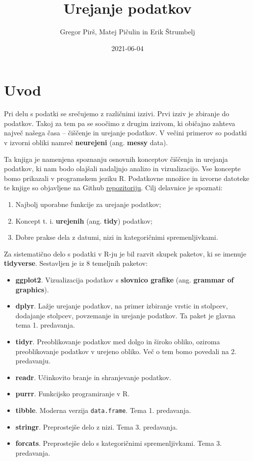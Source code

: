 \documentclass[
]{book}
\title{Urejanje podatkov}
\author{Gregor Pirš, Matej Pičulin in Erik Štrumbelj}
\date{2021-06-04}
\providecommand{\tightlist}{%
  \setlength{\itemsep}{0pt}\setlength{\parskip}{0pt}}
\begin{document}
\maketitle

{
\setcounter{tocdepth}{1}
\tableofcontents
}
\hypertarget{uvod}{%
\chapter*{Uvod}\label{uvod}}

Pri delu s podatki se srečujemo z različnimi izzivi. Prvi izziv je zbiranje do podatkov. Takoj za tem pa se soočimo z drugim izzivom, ki običajno zahteva največ našega časa -- čiščenje in urejanje podatkov. V večini primerov so podatki v izvorni obliki namreč \textbf{neurejeni} (ang. \textbf{messy} data).

Ta knjiga je namenjena spoznanju osnovnih konceptov čiščenja in urejanja podatkov, ki nam bodo olajšali nadaljnjo analizo in vizualizacijo. Vse koncepte bomo prikazali v programskem jeziku R. Podatkovne množice in izvorne datoteke te knjige so objavljene na Github \href{https://github.com/bstatcomp/urejanje-podatkov}{repozitoriju}. Cilj delavnice je spoznati:

\begin{enumerate}
\def\labelenumi{\arabic{enumi})}
\tightlist
\item
  Najbolj uporabne funkcije za urejanje podatkov;
\item
  Koncept t. i. \textbf{urejenih} (ang. \textbf{tidy}) podatkov;
\item
  Dobre prakse dela z datumi, nizi in kategoričnimi spremenljivkami.
\end{enumerate}

Za sistematično delo s podatki v R-ju je bil razvit skupek paketov, ki se imenuje \textbf{tidyverse}. Sestavljen je iz 8 temeljnih paketov:

\begin{itemize}
\tightlist
\item
  \textbf{ggplot2}. Vizualizacija podatkov s \textbf{slovnico grafike} (ang. \textbf{grammar of graphics}).
\item
  \textbf{dplyr}. Lažje urejanje podatkov, na primer izbiranje vrstic in stolpcev, dodajanje stolpcev, povzemanje in urejanje podatkov. Ta paket je glavna tema 1. predavanja.
\item
  \textbf{tidyr}. Preoblikovanje podatkov med dolgo in široko obliko, oziroma preoblikovanje podatkov v urejeno obliko. Več o tem bomo povedali na 2. predavanju.
\item
  \textbf{readr}. Učinkovito branje in shranjevanje podatkov.
\item
  \textbf{purrr}. Funkcijsko programiranje v R.
\item
  \textbf{tibble}. Moderna verzija \texttt{data.frame}. Tema 1. predavanja.
\item
  \textbf{stringr}. Preprostejše delo z nizi. Tema 3. predavanja.
\item
  \textbf{forcats}. Preprostejše delo s kategoričnimi spremenljivkami. Tema 3. predavanja.
\end{itemize}
\end{document}
